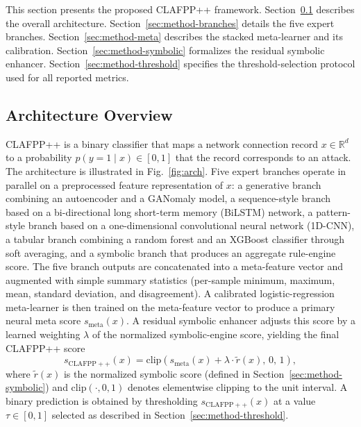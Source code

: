\documentclass[pdflatex,sn-mathphys-num]{sn-jnl}
\theoremstyle{thmstyleone}
\theoremstyle{thmstyletwo}
\theoremstyle{thmstylethree}
\begin{document}
This section presents the proposed CLAFPP++ framework. Section~\ref{sec:method-overview} describes the overall architecture. Section~\ref{sec:method-branches} details the five expert branches. Section~\ref{sec:method-meta} describes the stacked meta-learner and its calibration. Section~\ref{sec:method-symbolic} formalizes the residual symbolic enhancer. Section~\ref{sec:method-threshold} specifies the threshold-selection protocol used for all reported metrics.

\subsection{Architecture Overview}\label{sec:method-overview}

CLAFPP++ is a binary classifier that maps a network connection record $x \in \mathbb{R}^{d}$ to a probability $p(y=1 \mid x) \in [0,1]$ that the record corresponds to an attack. The architecture is illustrated in Fig.~\ref{fig:arch}. Five expert branches operate in parallel on a preprocessed feature representation of $x$: a generative branch combining an autoencoder and a GANomaly model, a sequence-style branch based on a bi-directional long short-term memory (BiLSTM) network, a pattern-style branch based on a one-dimensional convolutional neural network (1D-CNN), a tabular branch combining a random forest and an XGBoost classifier through soft averaging, and a symbolic branch that produces an aggregate rule-engine score. The five branch outputs are concatenated into a meta-feature vector and augmented with simple summary statistics (per-sample minimum, maximum, mean, standard deviation, and disagreement). A calibrated logistic-regression meta-learner is then trained on the meta-feature vector to produce a primary neural meta score $s_{\mathrm{meta}}(x)$. A residual symbolic enhancer adjusts this score by a learned weighting $\lambda$ of the normalized symbolic-engine score, yielding the final CLAFPP++ score
\begin{equation}
\label{eq:final-score}
s_{\mathrm{CLAFPP++}}(x) = \mathrm{clip}\!\left( s_{\mathrm{meta}}(x) + \lambda \cdot \tilde{r}(x),\, 0,\, 1 \right),
\end{equation}
where $\tilde{r}(x)$ is the normalized symbolic score (defined in Section~\ref{sec:method-symbolic}) and $\mathrm{clip}(\cdot, 0, 1)$ denotes elementwise clipping to the unit interval. A binary prediction is obtained by thresholding $s_{\mathrm{CLAFPP++}}(x)$ at a value $\tau \in [0,1]$ selected as described in Section~\ref{sec:method-threshold}.
\end{document}
